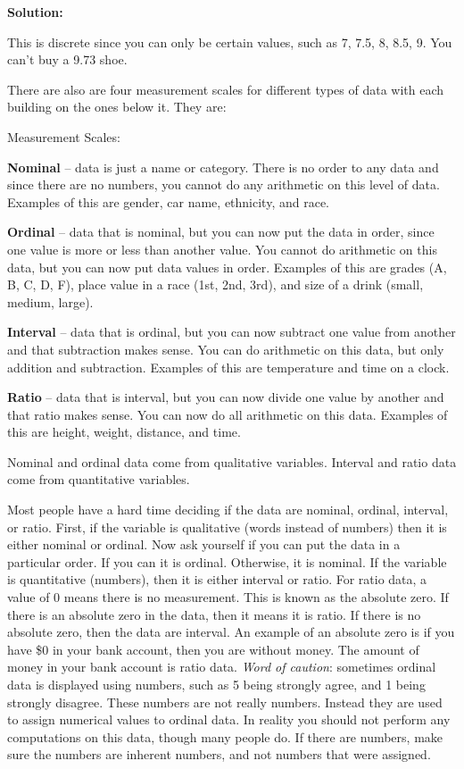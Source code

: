 \documentclass[]{book}
\begin{document}
\textbf{Solution:}

This is discrete since you can only be certain values, such as 7, 7.5, 8, 8.5, 9. You can't buy a 9.73 shoe.

There are also are four measurement scales for different types of data with each building on the ones below it. They are:

Measurement Scales:

\textbf{Nominal} -- data is just a name or category. There is no order to any data and since there are no numbers, you cannot do any arithmetic on this level of data. Examples of this are gender, car name, ethnicity, and race.

\textbf{Ordinal} -- data that is nominal, but you can now put the data in order, since one value is more or less than another value. You cannot do arithmetic on this data, but you can now put data values in order. Examples of this are grades (A, B, C, D, F), place value in a race (1st, 2nd, 3rd), and size of a drink (small, medium, large).

\textbf{Interval} -- data that is ordinal, but you can now subtract one value from another and that subtraction makes sense. You can do arithmetic on this data, but only addition and subtraction. Examples of this are temperature and time on a clock.

\textbf{Ratio} -- data that is interval, but you can now divide one value by another and that ratio makes sense. You can now do all arithmetic on this data. Examples of this are height, weight, distance, and time.

Nominal and ordinal data come from qualitative variables. Interval and ratio data come from quantitative variables.

Most people have a hard time deciding if the data are nominal, ordinal, interval, or ratio. First, if the variable is qualitative (words instead of numbers) then it is either nominal or ordinal. Now ask yourself if you can put the data in a particular order. If you can it is ordinal. Otherwise, it is nominal. If the variable is quantitative (numbers), then it is either interval or ratio. For ratio data, a value of 0 means there is no measurement. This is known as the absolute zero. If there is an absolute zero in the data, then it means it is ratio. If there is no absolute zero, then the data are interval. An example of an absolute zero is if you have \$0 in your bank account, then you are without money. The amount of money in your bank account is ratio data. \emph{Word of caution}: sometimes ordinal data is displayed using numbers, such as 5 being strongly agree, and 1 being strongly disagree. These numbers are not really numbers. Instead they are used to assign numerical values to ordinal data. In reality you should not perform any computations on this data, though many people do. If there are numbers, make sure the numbers are inherent numbers, and not numbers that were assigned.
\end{document}
